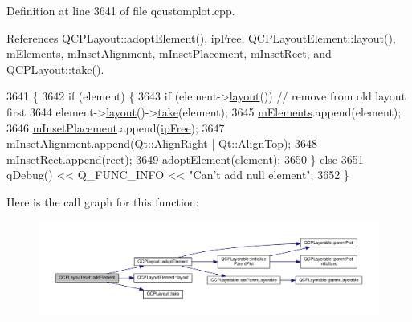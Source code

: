 Definition at line 3641 of file qcustomplot.\+cpp.



References Q\+C\+P\+Layout\+::adopt\+Element(), ip\+Free, Q\+C\+P\+Layout\+Element\+::layout(), m\+Elements, m\+Inset\+Alignment, m\+Inset\+Placement, m\+Inset\+Rect, and Q\+C\+P\+Layout\+::take().


\begin{DoxyCode}
3641                                                                              \{
3642   \textcolor{keywordflow}{if} (element) \{
3643     \textcolor{keywordflow}{if} (element->\hyperlink{class_q_c_p_layout_element_a6235f5384db871fc6e3387a1bc558b0d}{layout}()) \textcolor{comment}{// remove from old layout first}
3644       element->\hyperlink{class_q_c_p_layout_element_a6235f5384db871fc6e3387a1bc558b0d}{layout}()->\hyperlink{class_q_c_p_layout_ada26cd17e56472b0b4d7fbbc96873e4c}{take}(element);
3645     \hyperlink{class_q_c_p_layout_inset_a7e618ac870f69f2fe2eae2a04500e763}{mElements}.append(element);
3646     \hyperlink{class_q_c_p_layout_inset_a57a0a4e445cc78eada29765ecf092abe}{mInsetPlacement}.append(\hyperlink{class_q_c_p_layout_inset_a8b9e17d9a2768293d2a7d72f5e298192aa4802986ea2cea457f932b115acba59e}{ipFree});
3647     \hyperlink{class_q_c_p_layout_inset_a55e9b84c310136ff985a6544184ab64a}{mInsetAlignment}.append(Qt::AlignRight | Qt::AlignTop);
3648     \hyperlink{class_q_c_p_layout_inset_aaa8f6b5029458f3d97a65239524a2b33}{mInsetRect}.append(\hyperlink{class_q_c_p_layout_element_affdfea003469aac3d0fac5f4e06171bc}{rect});
3649     \hyperlink{class_q_c_p_layout_af6dbbc24156a808da29cd1ec031729a3}{adoptElement}(element);
3650   \} \textcolor{keywordflow}{else}
3651     qDebug() << Q\_FUNC\_INFO << \textcolor{stringliteral}{"Can't add null element"};
3652 \}
\end{DoxyCode}


Here is the call graph for this function\+:\nopagebreak
\begin{figure}[H]
\begin{center}
\leavevmode
\includegraphics[width=350pt]{class_q_c_p_layout_inset_a8ff61fbee4a1f0ff45c398009d9f1e56_cgraph}
\end{center}
\end{figure}


